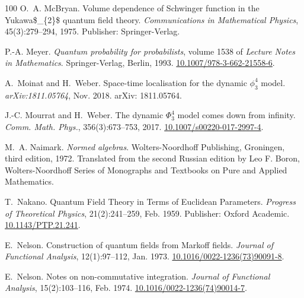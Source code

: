 \documentclass[11pt]{article}
\newcommand{\tmtextit}[1]{{\itshape{#1}}}
\begin{document}
\begin{thebibliography}{100}
  O.~A. McBryan. {\newblock}Volume
  dependence of Schwinger function in the Yukawa\$\_\{2\}\$ quantum field
  theory. {\newblock}\tmtextit{Communications in Mathematical Physics},
  45(3):279--294, 1975. {\newblock}Publisher: Springer-Verlag.
  
  P.-A. Meyer. {\newblock}\tmtextit{Quantum
  probability for probabilists}, volume 1538 of \tmtextit{Lecture Notes in
  Mathematics}. {\newblock}Springer-Verlag, Berlin, 1993. {\newblock}
  \href{https://doi.org/10.1007/978-3-662-21558-6}{10.1007/978-3-662-21558-6}.
  
  A.~Moinat and H.~Weber.
  {\newblock}Space-time localisation for the dynamic $\phi^4_3$ model.
  {\newblock}\tmtextit{arXiv:1811.05764}, Nov. 2018. {\newblock}arXiv:
  1811.05764.
  
  J.-C. Mourrat and H.~Weber. {\newblock}The dynamic
  $\Phi^4_3$ model comes down from infinity. {\newblock}\tmtextit{Comm. Math.
  Phys.}, 356(3):673--753, 2017. {\newblock}
  \href{https://doi.org/10.1007/s00220-017-2997-4}{10.1007/s00220-017-2997-4}.
  
  M.~A. Naimark. {\newblock}\tmtextit{Normed algebras}.
  {\newblock}Wolters-Noordhoff Publishing, Groningen, third edition, 1972.
  {\newblock}Translated from the second Russian edition by Leo F. Boron,
  Wolters-Noordhoff Series of Monographs and Textbooks on Pure and Applied
  Mathematics.
  
  T.~Nakano. {\newblock}Quantum Field Theory
  in Terms of Euclidean Parameters. {\newblock}\tmtextit{Progress of
  Theoretical Physics}, 21(2):241--259, Feb. 1959. {\newblock}Publisher:
  Oxford Academic.
  \href{https://doi.org/10.1143/PTP.21.241}{10.1143/PTP.21.241}.
  
  E.~Nelson. {\newblock}Construction of
  quantum fields from Markoff fields. {\newblock}\tmtextit{Journal of
  Functional Analysis}, 12(1):97--112, Jan. 1973. {\newblock}
  \href{https://doi.org/10.1016/0022-1236(73)90091-8}{10.1016/0022-1236(73)90091-8}.
  
  E.~Nelson. {\newblock}Notes on
  non-commutative integration. {\newblock}\tmtextit{Journal of Functional
  Analysis}, 15(2):103--116, Feb. 1974. {\newblock}
  \href{https://doi.org/10.1016/0022-1236(74)90014-7}{10.1016/0022-1236(74)90014-7}.
  

\end{thebibliography}
\end{document}
